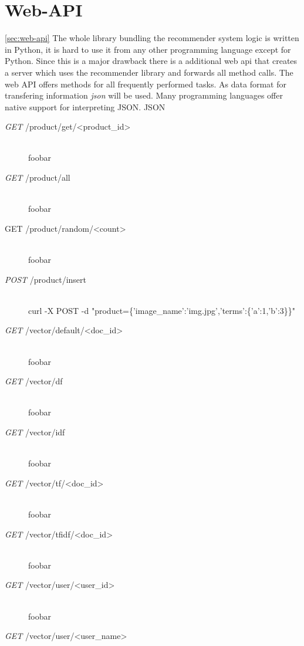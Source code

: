 

\section{Web-API}
\ref{sec:web-api}
The whole library bundling the recommender system logic is written in Python, it is hard to use it from any other programming language except for Python.
Since this is a major drawback there is a additional \gls{web api} that creates a server which uses the recommender library and forwards all method calls.
The web API offers methods for all frequently performed tasks.
As data format for transfering information \textit{\gls{json}} will be used.
Many programming languages offer native support for interpreting JSON.
{\color{red}JSON}

\begin{description}
    \item[\textit{GET} /product/get/\textless product\_id\textgreater]\hfill\\
        foobar
    \item[\textit{GET} /product/all]\hfill\\
        foobar
    \item[GET /product/random/\textless count\textgreater]\hfill\\
        foobar
    \item[\textit{POST} /product/insert]\hfill\\
        curl -X POST -d "product=\{'image\_name':'img.jpg','terms':\{'a':1,'b':3\}\}"
    \item[\textit{GET} /vector/default/\textless doc\_id\textgreater]\hfill\\
        foobar
    \item[\textit{GET} /vector/df]\hfill\\
        foobar
    \item[\textit{GET} /vector/idf]\hfill\\
        foobar
    \item[\textit{GET} /vector/tf/\textless doc\_id\textgreater]\hfill\\
        foobar
    \item[\textit{GET} /vector/tfidf/\textless doc\_id\textgreater]\hfill\\
        foobar
    \item[\textit{GET} /vector/user/\textless user\_id\textgreater]\hfill\\
        foobar
    \item[\textit{GET} /vector/user/\textless user\_name\textgreater]\hfill\\

\end{description}
